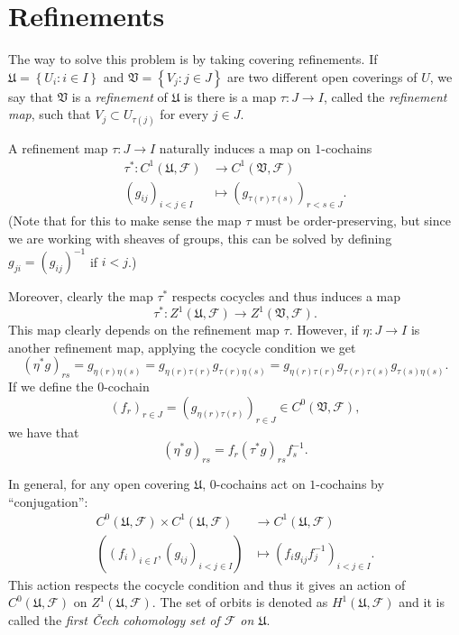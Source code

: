 \documentclass[12pt,a4paper]{article}
\begin{document}
    \section*{Refinements}
    The way to solve this problem is by taking covering refinements. If $\mathfrak{U}=\left\{ U_i: i \in I \right\}$ and $\mathfrak{V}=\left\{ V_j: j \in J \right\}$ are two different open coverings of $U$, we say that $\mathfrak{V}$ is a \emph{refinement} of $\mathfrak{U}$ is there is a map $\tau:J\rightarrow I$, called the \emph{refinement map}, such that $V_j \subset U_{\tau(j)}$ for every $j \in J$. 

    A refinement map $\tau:J \rightarrow I$ naturally induces a map on $1$-cochains
    \begin{align*}
      \tau^* :C^1(\mathfrak{U},\mathcal{F})&\longrightarrow C^1(\mathfrak{V},\mathcal{F})\\ 
      (g_{ij})_{i<j \in I} &\longmapsto (g_{\tau(r)\tau(s)})_{r<s \in J}. 
      \end{align*}
      (Note that for this to make sense the map $\tau$ must be order-preserving, but since we are working with sheaves of groups, this can be solved by defining $g_{ji}=(g_{ij})^{-1}$ if $i<j$.)

      Moreover, clearly the map $\tau^*$ respects cocycles and thus induces a map $$\tau^*:Z^1(\mathfrak{U},\mathcal{F}) \rightarrow Z^1(\mathfrak{V},\mathcal{F}).$$
      This map clearly depends on the refinement map $\tau$. However, if $\eta: J \rightarrow I$ is another refinement map, applying the cocycle condition we get
      \begin{equation*}
	(\eta^*g)_{rs}= g_{\eta(r)\eta(s)}= g_{\eta(r)\tau(r)} g_{\tau(r)\eta(s)} = g_{\eta(r)\tau(r)} g_{\tau(r)\tau(s)} g_{\tau(s) \eta(s)}.
      \end{equation*}
      If we define the $0$-cochain 
      \begin{equation*}
	(f_r)_{r \in J} = (g_{\eta(r)\tau(r)})_{r\in J} \in C^0(\mathfrak{V},\mathcal{F}),
      \end{equation*}
      we have that
      \begin{equation*}
	(\eta^*g)_{rs}=f_r (\tau^*g)_{rs} f_s^{-1}.
      \end{equation*}

      In general, for any open covering $\mathfrak{U}$, $0$-cochains act on $1$-cochains by ``conjugation'':
      \begin{align*}
	C^0(\mathfrak{U},\mathcal{F})\times C^1(\mathfrak{U},\mathcal{F})&\longrightarrow C^1(\mathfrak{U},\mathcal{F})\\ 
	( (f_i)_{i\in I}, (g_{ij})_{i <j \in I} )&\longmapsto (f_i g_{ij} f_j^{-1})_{i <j \in I}. 
	\end{align*}
	This action respects the cocycle condition and thus it gives an action of $C^0(\mathfrak{U},\mathcal{F})$ on $Z^1(\mathfrak{U},\mathcal{F})$. The set of orbits is denoted as $H^1(\mathfrak{U},\mathcal{F})$ and it is called the \emph{first \v{C}ech cohomology set of $\mathcal{F}$ on $\mathfrak{U}$}.
	
\end{document}
